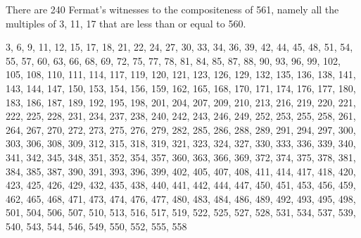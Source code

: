 \documentclass[12pt, titlepage]{amsart}
\theoremstyle{definition}
\begin{document}
\begin{appendix}
	There are 240 Fermat's witnesses to the compositeness of 561, namely all the multiples of 3, 11, 17 that are less than or equal to 560. 
	
	\begin{seqsplit}
	3, 6, 9, 11, 12, 15, 17, 18, 21, 22, 24, 27, 30, 33, 34, 36, 39, 42, 44, 45, 48, 51, 54, 55, 57, 60, 63, 66, 68, 69, 72, 75, 77, 78, 81, 84, 85, 87, 88, 90, 93, 96, 99, 102, 105, 108, 110, 111, 114, 117, 119, 120, 121, 123, 126, 129, 132, 135, 136, 138, 141, 143, 144, 147, 150, 153, 154, 156, 159, 162, 165, 168, 170, 171, 174, 176, 177, 180, 183, 186, 187, 189, 192, 195, 198, 201, 204, 207, 209, 210, 213, 216, 219, 220, 221, 222, 225, 228, 231, 234, 237, 238, 240, 242, 243, 246, 249, 252, 253, 255, 258, 261, 264, 267, 270, 272, 273, 275, 276, 279, 282, 285, 286, 288, 289, 291, 294, 297, 300, 303, 306, 308, 309, 312, 315, 318, 319, 321, 323, 324, 327, 330, 333, 336, 339, 340, 341, 342, 345, 348, 351, 352, 354, 357, 360, 363, 366, 369, 372, 374, 375, 378, 381, 384, 385, 387, 390, 391, 393, 396, 399, 402, 405, 407, 408, 411, 414, 417, 418, 420, 423, 425, 426, 429, 432, 435, 438, 440, 441, 442, 444, 447, 450, 451, 453, 456, 459, 462, 465, 468, 471, 473, 474, 476, 477, 480, 483, 484, 486, 489, 492, 493, 495, 498, 501, 504, 506, 507, 510, 513, 516, 517, 519, 522, 525, 527, 528, 531, 534, 537, 539, 540, 543, 544, 546, 549, 550, 552, 555, 558
	\end{seqsplit}
	
	\listoffigures
	
	\listoftables
	
	\end{appendix}
		
		
	\newpage
		
	
	
	
	
\end{document}
